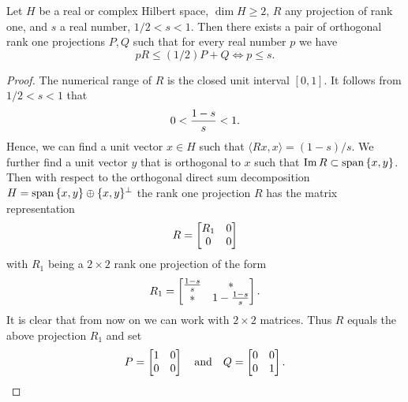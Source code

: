 \documentclass{article}
\begin{document}
\begin{lemma}\label{mikmik}
Let $H$ be a real or complex Hilbert space, $\dim H \ge 2$, $R$ any projection of rank one, and $s$ a real number, $1/2 < s < 1$. Then there exists a pair of orthogonal rank one projections $P,Q$ such that for every real number $p$ we have
$$
pR \le (1/2) P + Q \iff p \le s.
$$
\end{lemma}

\begin{proof}
The numerical range of $R$ is the closed unit interval $[0,1]$. It follows from $1/2 < s < 1$ that 
$$
0 < { 1- s \over s} < 1.
$$
Hence, we can find a unit vector $x \in H$ such that $\langle Rx , x \rangle = (1-s)/s$. We further find a unit vector $y$ that is orthogonal to $x$ such that ${\rm Im}\, R \subset {\rm span}\, \{ x,y \}$. Then with respect to the orthogonal direct sum decomposition $H = {\rm span} \, \{ x,y \} \oplus \{ x,y \}^\perp$ the rank one projection $R$ has the matrix representation
$$
R =  \left[ \begin{matrix} R_1 & 0 \cr 0 & 0 \cr \end{matrix} \right]
$$
with $R_1$ being a $2\times 2$ rank one projection of the form
$$
R_1 =  \left[ \begin{matrix} {1-s \over s} & * \cr * & 1-  {1-s \over s} \cr \end{matrix} \right] .
$$
It is clear that from now on we can work with $2\times 2$ matrices. Thus $R$ equals the above projection $R_1$ and set
$$
P =  \left[ \begin{matrix} 1 & 0 \cr 0 & 0 \cr \end{matrix} \right] \ \ \ {\rm and} \ \ \ Q = \left[ \begin{matrix} 0 & 0 \cr 0 & 1 \cr \end{matrix} \right] .
$$


\end{proof}
\end{document}
